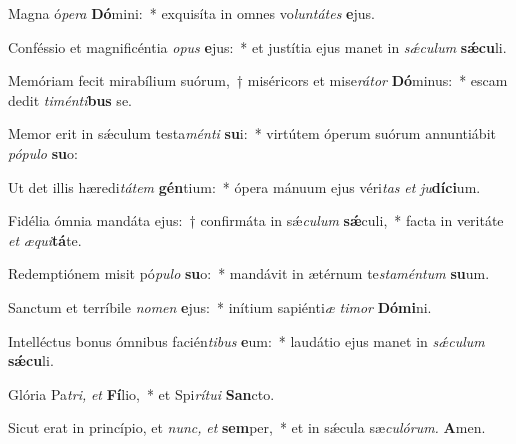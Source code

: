 \item Magna ó\textit{pera} \textbf{Dó}mini:~* exquisíta in omnes vo\hspace*{0.01em}\textit{luntátes} \textbf{e}jus.
\item Conféssio et magnificéntia \textit{opus} \textbf{e}jus:~* et justítia ejus manet in \textit{sǽculum} \textbf{sǽ}\textbf{cu}li.
\item Memóriam fecit mirabílium suórum,~† miséricors et mise\textit{rátor} \textbf{Dó}minus:~* escam dedit \textit{timénti}\textbf{bus} se.
\item Memor erit in sǽculum testa\textit{ménti} \textbf{su}i:~* virtútem óperum suórum annuntiábit \textit{pópulo} \textbf{su}o:
\item Ut det illis hæredi\textit{tátem} \textbf{gén}tium:~* ópera mánuum ejus véri\textit{tas} \textit{et} \textit{ju}\textbf{dí}\textbf{ci}um.
\item Fidélia ómnia mandáta ejus:~† confirmáta in sǽ\tinyhspace\textit{culum} \textbf{sǽ}culi,~* facta in veritáte \textit{et} \textit{æqui}\textbf{tá}te.
\item Redemptiónem misit pó\textit{pulo} \textbf{su}o:~* mandávit in ætérnum te\tinyhspace\textit{staméntum} \textbf{su}um.
\item Sanctum et terríbile \textit{nomen} \textbf{e}jus:~* inítium sapiénti\tinyhspace\textit{æ} \textit{timor} \textbf{Dó}\textbf{mi}ni.
\item Intelléctus bonus ómnibus facién\textit{tibus} \textbf{e}um:~* laudátio ejus manet in \textit{sǽculum} \textbf{sǽ}\textbf{cu}li.
\item Glória Pa\tinyhspace\textit{tri,} \textit{et} \textbf{Fí}lio,~* et Spi\hspace*{0.01em}\textit{rítui} \textbf{San}cto.
\item Sicut erat in princípio, et \textit{nunc,} \textit{et} \textbf{sem}per,~* et in sǽcula sæ\tinyhspace\textit{culórum.} \textbf{A}men.